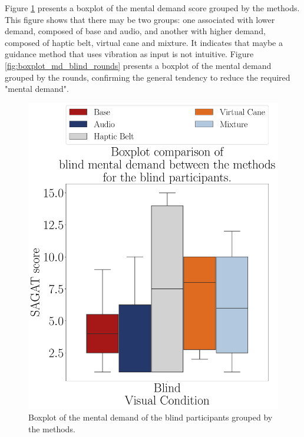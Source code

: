 Figure \ref{fig:boxplot_md_blind_scene}  presents a boxplot of the mental demand score grouped by the methods. This figure shows that there may be two groups: one associated with lower demand, composed of base and audio, and another with higher demand, composed of haptic belt, virtual cane and mixture. It indicates that maybe a guidance method that uses vibration as input is not intuitive. Figure \ref{fig:boxplot_md_blind_rounds} presents a boxplot of the mental demand grouped by the rounds, confirming the general tendency to reduce the required "mental demand". 

\begin{figure}[!htb]
    \centering
    \begin{minipage}{0.45\textwidth}
        \centering
        \includegraphics[width = \textwidth]{Resultados/Nasa/Figuras/pdf/boxplot_md_blind_scene.pdf}
        \caption{Boxplot of the mental demand of the blind participants grouped by the methods.}
        \label{fig:boxplot_md_blind_scene}
    \end{minipage}
    \begin{minipage}{0.075\textwidth}

\end{minipage}
\end{figure}

